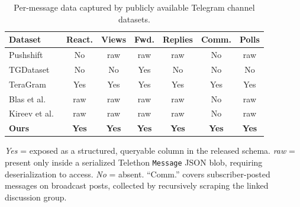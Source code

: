 \begin{table}[htbp]
\centering
\caption{Per-message data captured by publicly available Telegram channel datasets.}
\label{tab:dataset-richness}
\small
\setlength{\tabcolsep}{4pt}
\begin{tabular}{@{}lcccccc@{}}
\toprule
\textbf{Dataset} & \textbf{React.} & \textbf{Views} & \textbf{Fwd.} & \textbf{Replies} & \textbf{Comm.} & \textbf{Polls} \\
\midrule
Pushshift~\cite{baumgartner2020}      & No  & raw & raw & raw & No & raw \\
TGDataset~\cite{lamorgia2025}         & No  & No  & Yes & No  & No  & No  \\
TeraGram~\cite{teragram2026}          & Yes & Yes & Yes & Yes & Yes & Yes \\
Blas et al.~\cite{blas2025}           & raw & raw & raw & raw & No  & raw \\
Kireev et al.~\cite{propaganda2025}   & raw & raw & raw & raw & No  & raw \\
\textbf{Ours}                          & \textbf{Yes} & \textbf{Yes} & \textbf{Yes} & \textbf{Yes} & \textbf{Yes} & \textbf{Yes} \\
\bottomrule
\end{tabular}\par
\medskip
\footnotesize\emph{Yes} = exposed as a structured, queryable column in the released schema. \emph{raw} = present only inside a serialized Telethon \texttt{Message} JSON blob, requiring deserialization to access. \emph{No} = absent. ``Comm.'' covers subscriber-posted messages on broadcast posts, collected by recursively scraping the linked discussion group.
\end{table}

